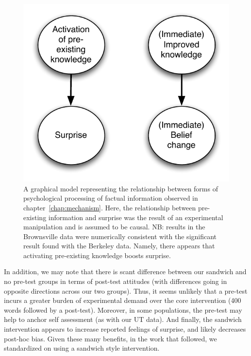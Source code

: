 \begin{figure}
    \begin{center}
        \includegraphics{causal2.pdf}
    \end{center}
    \caption{A graphical model representing the relationship between forms of
        psychological processing of factual information observed in
        chapter~\ref{chap:mechanism}. Here, the relationship between
        pre-existing information and surprise was the result of an experimental
        manipulation and is assumed to be causal. NB: results in the Brownsville
        data were numerically consistent with the significant result found with
        the Berkeley data. Namely, there appears that activating pre-existing
        knowledge boosts surprise.}
    \label{fig:causal-mechanism}
\end{figure}

In addition, we may note that there is scant difference between our sandwich and
no pre-test groups in terms of post-test attitudes (with differences going in
opposite directions across our two groups). Thus, it seems unlikely that a
pre-test incurs a greater burden of experimental demand over the core
intervention (400 words followed by a post-test). Moreover, in some populations,
the pre-test may help to anchor self assessment (as with our UT data). And
finally, the sandwich intervention appears to increase reported feelings of
surprise, and likely decreases post-hoc bias. Given these many benefits, in the
work that followed, we standardized on using a sandwich style intervention.

